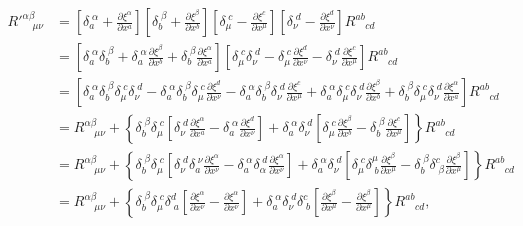     \begin{align*}
        R'^{\alpha\beta}_{\quad\mu\nu} &= \left[\delta_a^{\;\alpha}+\frac{\partial \xi^{\alpha}}{\partial x^a} \right]\left[\delta_b^{\;\beta}+\frac{\partial \xi^{\beta}}{\partial x^b} \right]\left[\delta_{\mu}^{\;c}-\frac{\partial \xi^{c}}{\partial x^{\mu}} \right]\left[\delta_{\nu}^{\;d}-\frac{\partial \xi^{d}}{\partial x^{\nu}} \right]R^{ab}_{\quad cd}\\
        &= \left[\delta_a^{\;\alpha}\delta_b^{\;\beta} + \delta_a^{\;\alpha}\frac{\partial \xi^{\beta}}{\partial x^b} + \delta_b^{\;\beta}\frac{\partial\xi^{\alpha}}{\partial x^a} \right]\left[\delta_{\mu}^{\;c}\delta_{\nu}^{\;d} - \delta_{\mu}^{\;c}\frac{\partial\xi^{d}}{\partial x^{\nu}} - \delta_{\nu}^{\;d}\frac{\partial\xi^c}{\partial x^{\mu}} \right]R^{ab}_{\quad cd}\\
        &= \left[\delta_a^{\;\alpha}\delta_b^{\;\beta}\delta_{\mu}^{\;c}\delta_{\nu}^{\;d} - \delta_a^{\;\alpha}\delta_b^{\;\beta}\delta_{\mu}^{\;c}\frac{\partial\xi^d}{\partial x^{\nu}} - \delta_a^{\;\alpha}\delta_b^{\;\beta}\delta_{\nu}^{\;d}\frac{\partial \xi^c}{\partial x^{\mu}} + \delta_a^{\;\alpha}\delta_{\mu}^{\;c}\delta_{\nu}^{\;d}\frac{\partial \xi^{\beta}}{\partial x^b} + \delta_b^{\;\beta}\delta_{\mu}^{\;c}\delta_{\nu}^{\;d}\frac{\partial\xi^{\alpha}}{\partial x^a} \right]R^{ab}_{\quad cd}\\
        &= R^{\alpha\beta}_{\quad\mu\nu}+\left\{\delta_b^{\;\beta}\delta_{\mu}^{\;c}\left[\delta_{\nu}^{\;d}\frac{\partial\xi^{\alpha}}{\partial x^a} - \delta_a^{\;\alpha}\frac{\partial\xi^d}{\partial x^{\nu}} \right] + \delta_a^{\;\alpha}\delta_{\nu}^{\;d}\left[\delta_{\mu}^{\;c}\frac{\partial \xi^{\beta}}{\partial x^b}-  \delta_b^{\;\beta}\frac{\partial \xi^c}{\partial x^{\mu}} \right] \right\}R^{ab}_{\quad cd}\\
        &= R^{\alpha\beta}_{\quad\mu\nu}+\left\{\delta_b^{\;\beta}\delta_{\mu}^{\;c}\left[\delta_{\nu}^{\;d}\delta_{a}^{\;\nu} \frac{\partial\xi^{\alpha}}{\partial x^{\nu}} - \delta_a^{\;\alpha}\delta_{\alpha}^{\;d} \frac{\partial\xi^{\alpha}}{\partial x^{\nu}} \right] + \delta_a^{\;\alpha}\delta_{\nu}^{\;d}\left[\delta_{\mu}^{\;c}\delta^{\mu}_{\;b} \frac{\partial \xi^{\beta}}{\partial x^{\mu}}-  \delta_b^{\;\beta}\delta^c_{\;\beta} \frac{\partial \xi^{\beta}}{\partial x^{\mu}} \right] \right\}R^{ab}_{\quad cd}\\
        &= R^{\alpha\beta}_{\quad\mu\nu}+\left\{\delta_b^{\;\beta}\delta_{\mu}^{\;c}\delta^d_{\;a} \left[\frac{\partial\xi^{\alpha}}{\partial x^{\nu}} - \frac{\partial\xi^{\alpha}}{\partial x^{\nu}} \right] + \delta_a^{\;\alpha}\delta_{\nu}^{\;d}\delta^c_{\;b} \left[\frac{\partial \xi^{\beta}}{\partial x^{\mu}}  - \frac{\partial \xi^{\beta}}{\partial x^{\mu}} \right] \right\}R^{ab}_{\quad cd},
    \end{align*}

